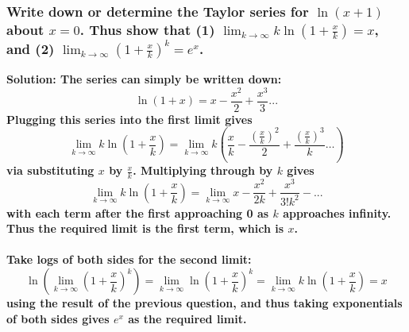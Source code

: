 \documentclass{article}
\begin{document}
\hrulefill
\subsubsection*{Write down or determine the Taylor series for $\ln (x+1)$ about $x=0$. Thus show that (1) $\lim_{k \to \infty} k \ln (1+\frac{x}{k})=x$, and (2) $\lim_{k \to \infty} (1+\frac{x}{k})^k = e^x$.}
\bf Solution: \normalfont The series can simply be written down: 
\begin{equation*}
\ln (1+x) = x - \frac{x^2}{2} + \frac{x^3}{3}... 
\end{equation*}
Plugging this series into the first limit gives
\begin{equation*}
    \lim_{k \to \infty} k \ln (1+\frac{x}{k}) = \lim_{k \to \infty} k( \frac{x}{k} - \frac{(\frac{x}{k})^2}{2} + \frac{{(\frac{x}{k})^3}}{k} \dots )
\end{equation*}
via substituting $x$ by $\frac{x}{k}$. Multiplying through by $k$ gives
\begin{equation*}
    \lim_{k \to \infty} k \ln (1+\frac{x}{k}) = \lim_{k \to \infty} x - \frac{x^2}{2k} + \frac{x^3}{3! k^2} - ...
\end{equation*}
with each term after the first approaching 0 as $k$ approaches infinity. Thus the required limit is the first term, which is $x$.
\\
\\
Take logs of both sides for the second limit:
\begin{equation*}
    \ln (\lim_{k \to \infty} (1+\frac{x}{k})^k) = \lim_{k \to \infty} \ln (1+\frac{x}{k})^k = \lim_{k \to \infty} k \ln (1+\frac{x}{k}) = x
\end{equation*}
using the result of the previous question, and thus taking exponentials of both sides gives $e^x$ as the required limit.

\hrulefill
\end{document}
